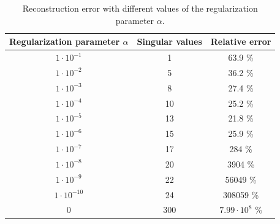\documentclass[12pt,a4]{article}
\begin{document}
\begin{table}
\begin{center}
\begin{tabular}[t]{|c|c|c|}
\hline
Regularization parameter $\alpha$ & Singular values & Relative error
\\ \hline
$1 \cdot 10^{-1}$  &  1    & 63.9              \% \\ \hline
$1 \cdot 10^{-2}$  &  5    & 36.2              \% \\ \hline
$1 \cdot 10^{-3}$  &  8    & 27.4              \% \\ \hline
$1 \cdot 10^{-4}$  &  10   & 25.2              \% \\ \hline
$1 \cdot 10^{-5}$  &  13   & 21.8              \% \\ \hline
$1 \cdot 10^{-6}$  &  15   & 25.9              \% \\ \hline
$1 \cdot 10^{-7}$  &  17   & 284               \% \\ \hline
$1 \cdot 10^{-8}$  &  20   & 3904              \% \\ \hline
$1 \cdot 10^{-9}$  &  22   & 56049             \% \\ \hline
$1 \cdot 10^{-10}$ &  24   & 308059            \% \\ \hline
$0$                &  300  & $7.99 \cdot 10^8$ \% \\ \hline
\end{tabular}
\end{center}
\caption{Reconstruction error with different values of the regularization parameter $\alpha$.}
\label{tab:recs}
\end{table}
\end{document}
